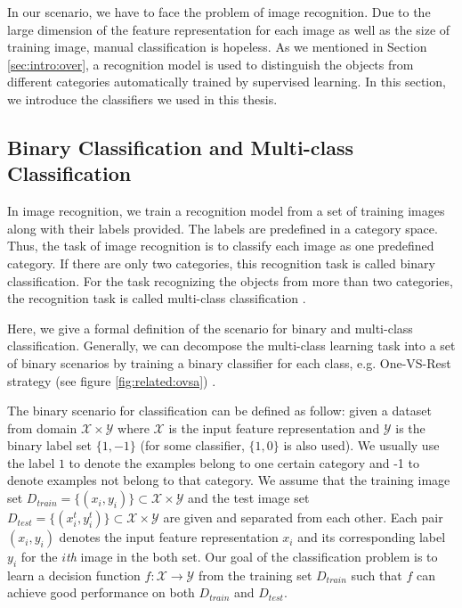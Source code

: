 In our scenario, we have to face the problem of image recognition. Due to the large dimension of the feature representation for each image as well as the size of training image, manual classification is hopeless. As we mentioned in Section \ref{sec:intro:over}, a recognition model is used to distinguish the objects from different categories automatically trained by supervised learning. In this section, we introduce the classifiers we used in this thesis.

\subsection{Binary Classification and Multi-class Classification}

In image recognition, we train a recognition model from a set of training images along with their labels provided. The labels are predefined in a category space. Thus, the task of image recognition is to classify each image as one predefined category. If there are only two categories, this recognition task is called binary classification. For the task recognizing the objects from more than two categories, the recognition task is called multi-class classification \cite{aytar2011tabula} \cite{krizhevsky2012imagenet}.  

Here, we give a formal definition of the scenario for binary and multi-class classification. Generally, we can decompose the multi-class learning task into a set of binary scenarios by training a binary classifier for each class, e.g. One-VS-Rest strategy (see figure \ref{fig:related:ovsa})\cite{rifkin2004defense} \cite{tsoumakas2006multi}.

The binary scenario for classification can be defined as follow: given a dataset from domain $\mathcal{X} \times \mathcal{Y}$ where $\mathcal{X}$ is the input feature representation and $\mathcal{Y}$ is the binary label set $\{1,-1\}$ (for some classifier, $\{1,0\}$ is also used). We usually use the label $1$ to denote the examples belong to one certain category and -1 to denote examples not belong to that category. 
We assume that the training image set $D_{train}=\{(x_i,y_i)\} \subset \mathcal{X} \times \mathcal{Y}$ and the test image set $D_{test}=\{(x^t_i,y^t_i)\}\subset \mathcal{X} \times \mathcal{Y}$ are given and separated from each other. Each pair $(x_i,y_i)$ denotes the input feature representation $x_i$ and its corresponding label $y_i$ for the $i$\textit{th} image in the both set. Our goal of the classification problem is to learn a decision function $f:\mathcal{X} \rightarrow \mathcal{Y}$ from the training set $D_{train}$ such that $f$ can achieve good performance on both $D_{train}$ and $D_{test}$. 

